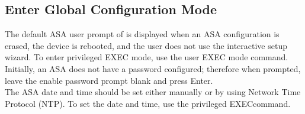 \subsection{Enter Global Configuration Mode}

The default ASA user prompt of  is displayed when an ASA configuration is erased, the device is rebooted, and the user does not use the interactive setup wizard. To enter privileged EXEC mode, use the  user EXEC mode command. Initially, an ASA does not have a password configured; therefore when prompted, leave the enable password prompt blank and press Enter.\\

The ASA date and time should be set either manually or by using Network Time Protocol (NTP). To set the date and time, use the  privileged EXECcommand.